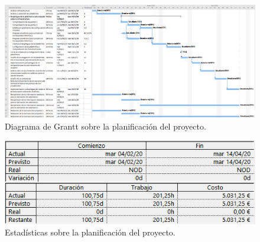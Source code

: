\begin{landscape}
\begin{figure}[hp]
  \centering
  \includegraphics[width=1.5\textwidth]{imaxes/extras/diagramaGranttt.png}
  \caption{Diagrama de Grantt sobre la planificación del proyecto.}
  \label{fig:tareasproyecto}
\end{figure}
\end{landscape}
\begin{figure}[h!]
  \centering
  \includegraphics[width=1\textwidth]{imaxes/extras/estadisticasProyecto.png}
  \caption{Estadísticas sobre la planificación del proyecto.}
  \label{fig:estadisticasproyecto}
\end{figure}
\FloatBarrier


